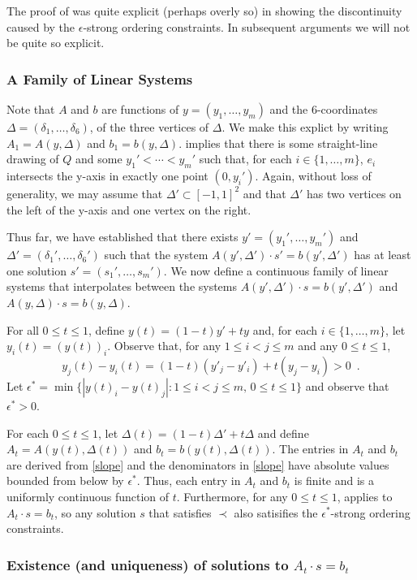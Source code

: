 \documentclass{patmorin}
\begin{document}
The proof of  was quite explicit (perhaps overly so)
in showing the discontinuity caused by the $\epsilon$-strong ordering
constraints.  In subsequent arguments we will not be quite so explicit.

\subsubsection{A Family of Linear Systems}

Note that $A$ and $b$ are functions of $y=(y_1,\ldots,y_m)$ and the
6-coordinates $\Delta=(\delta_1,\ldots,\delta_6)$, of the three vertices
of $\Delta$.  We make this explict by writing $A_1=A(y,\Delta)$ and
$b_1=b(y,\Delta)$.   implies that there is some
straight-line drawing of $Q$ and some $y_1'<\cdots< y_m'$ such that,
for each $i\in\{1,\ldots,m\}$, $e_i$ intersects the y-axis in exactly
one point $(0,y_i')$.  Again, without loss of generality, we may assume
that $\Delta'\subset [-1,1]^2$ and that $\Delta'$ has two vertices on
the left of the y-axis and one vertex on the right.

Thus far, we have established that there exists $y'=(y_1',\ldots,y_m')$
and $\Delta'=(\delta_1',\ldots,\delta_6')$ such that the system
$A(y',\Delta')\cdot s' = b(y',\Delta')$ has at least one solution
$s'=(s_1',\ldots,s_m')$.  We now define a continuous family of linear
systems that interpolates between the systems $A(y',\Delta')\cdot
s=b(y',\Delta')$ and $A(y,\Delta)\cdot s=b(y,\Delta)$.

For all $0\le t\le 1$, define $y(t) = (1-t)y' + ty$ and, for each
$i\in\{1,\ldots,m\}$, let $y_i(t)=(y(t))_i$.  Observe that, for any
$1\le i< j\le m$ and any $0\le t\le 1$,
\[
   y_j(t) - y_i(t) = (1-t)(y'_j-y'_i) + t(y_j-y_i) > 0 \enspace .
\]
Let $\epsilon^*=\min\{|y(t)_i-y(t)_j| : 1\le i< j\le m,\, 0\le t\le 1\}$
and observe that $\epsilon^* >0$.

For each $0\le t\le 1$, let $\Delta(t)=(1-t)\Delta' + t\Delta$
and define $A_t=A(y(t),\Delta(t))$ and $b_t=b(y(t),\Delta(t))$.
The entries in $A_t$ and $b_t$ are derived from \eqref{slope} and the
denominators in \eqref{slope} have absolute values bounded from below
by $\epsilon^*$.  Thus, each entry in $A_t$ and $b_t$ is finite and is a
uniformly continuous function of $t$.  Furthermore, for any $0\le t\le 1$,
 applies to $A_t\cdot s =b_t$, so any solution $s$
that satisfies $\prec$ also satisifies the $\epsilon^*$-strong ordering
constraints.

\subsubsection{Existence (and uniqueness) of solutions to $A_t\cdot s=b_t$}
\end{document}
